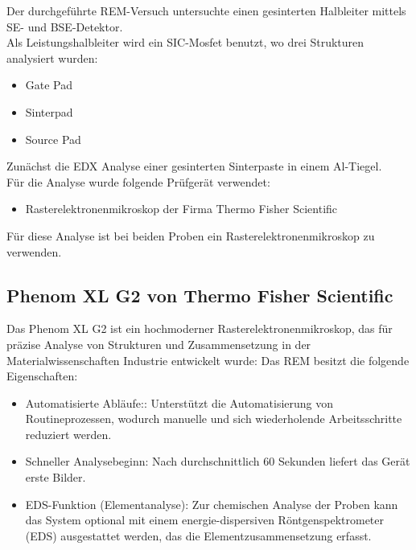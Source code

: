 Der durchgeführte REM-Versuch untersuchte einen gesinterten Halbleiter mittels SE- und BSE-Detektor.\\
Als Leistungshalbleiter wird ein SIC-Mosfet benutzt, wo drei Strukturen analysiert wurden: \cite{key}
\begin{itemize}
    \item Gate Pad
    \item Sinterpad
    \item Source Pad
\end{itemize}
Zunächst die EDX Analyse einer gesinterten Sinterpaste in einem Al-Tiegel.\\
Für die Analyse wurde folgende Prüfgerät verwendet:
\begin{itemize}
    \item Rasterelektronenmikroskop der Firma Thermo Fisher Scientific
\end{itemize}
Für diese Analyse ist bei beiden Proben ein Rasterelektronenmikroskop zu verwenden. 

\subsection{Phenom XL G2 von Thermo Fisher Scientific}
Das Phenom XL G2 ist ein hochmoderner Rasterelektronenmikroskop, das für präzise Analyse von Strukturen und Zusammensetzung in der Materialwissenschaften Industrie entwickelt wurde:
Das REM besitzt die folgende Eigenschaften: \cite{2}
\begin{itemize}
    \item Automatisierte Abläufe:: Unterstützt die Automatisierung von Routineprozessen, wodurch manuelle und sich wiederholende Arbeitsschritte reduziert werden.
    \item Schneller Analysebeginn: Nach durchschnittlich 60 Sekunden liefert das Gerät erste Bilder.
    \item EDS-Funktion (Elementanalyse): Zur chemischen Analyse der Proben kann das System optional mit einem energie-dispersiven Röntgenspektrometer (EDS) ausgestattet werden, das die Elementzusammensetzung erfasst.
\end{itemize}

